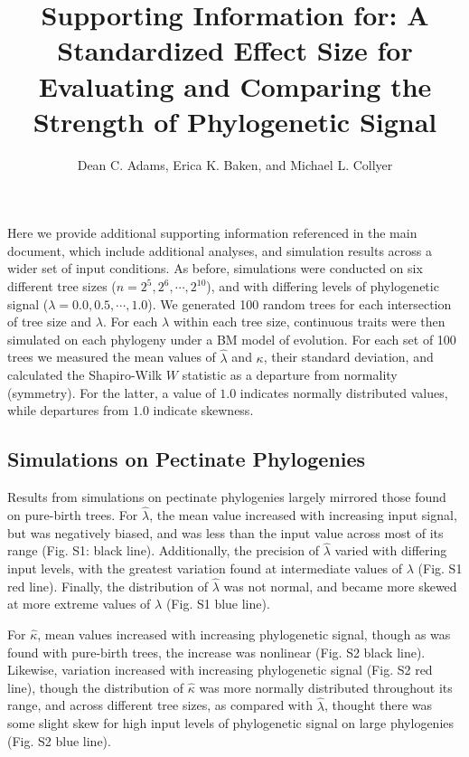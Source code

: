 \documentclass[
]{article}
\title{Supporting Information for: A Standardized Effect Size for Evaluating
and Comparing the Strength of Phylogenetic Signal}
\author{Dean C. Adams, Erica K. Baken, and Michael L. Collyer}
\date{}
\begin{document}
\maketitle

Here we provide additional supporting information referenced in the main
document, which include additional analyses, and simulation results
across a wider set of input conditions. As before, simulations were
conducted on six different tree sizes (\(n=2^5, 2^6, \cdots, 2^{10}\)),
and with differing levels of phylogenetic signal
(\(\lambda=0.0, 0.5, \cdots, 1.0\)). We generated 100 random trees for
each intersection of tree size and \(\lambda\). For each \(\lambda\)
within each tree size, continuous traits were then simulated on each
phylogeny under a BM model of evolution. For each set of 100 trees we
measured the mean values of \(\hat{\lambda}\) and \(\kappa\), their
standard deviation, and calculated the Shapiro-Wilk \(W\) statistic as a
departure from normality (symmetry). For the latter, a value of \(1.0\)
indicates normally distributed values, while departures from \(1.0\)
indicate skewness.

\hypertarget{simulations-on-pectinate-phylogenies}{%
\subsection{Simulations on Pectinate
Phylogenies}\label{simulations-on-pectinate-phylogenies}}

Results from simulations on pectinate phylogenies largely mirrored those
found on pure-birth trees. For \(\hat{\lambda}\), the mean value
increased with increasing input signal, but was negatively biased, and
was less than the input value across most of its range (Fig. S1: black
line). Additionally, the precision of \(\hat{\lambda}\) varied with
differing input levels, with the greatest variation found at
intermediate values of \(\lambda\) (Fig. S1 red line). Finally, the
distribution of \(\hat{\lambda}\) was not normal, and became more skewed
at more extreme values of \(\lambda\) (Fig. S1 blue line). \hfill\break

For \(\hat\kappa\), mean values increased with increasing phylogenetic
signal, though as was found with pure-birth trees, the increase was
nonlinear (Fig. S2 black line). Likewise, variation increased with
increasing phylogenetic signal (Fig. S2 red line), though the
distribution of \(\hat\kappa\) was more normally distributed throughout
its range, and across different tree sizes, as compared with
\(\hat{\lambda}\), thought there was some slight skew for high input
levels of phylogenetic signal on large phylogenies (Fig. S2 blue line).
\hfill\break
\end{document}
